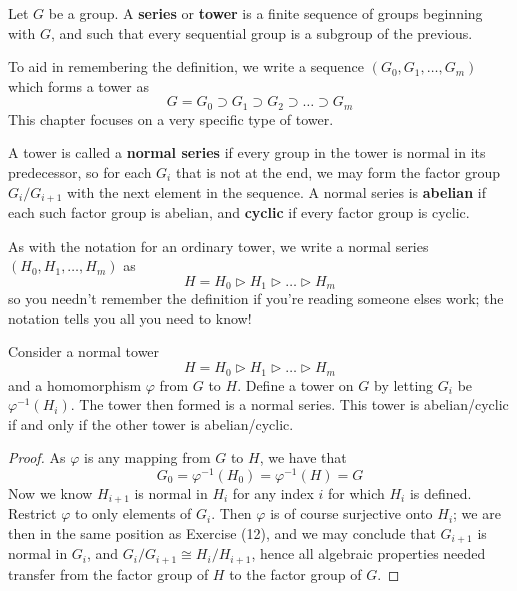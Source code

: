 \begin{definition}
    Let $G$ be a group. A {\bf series}  or {\bf tower}  is a finite sequence of groups beginning with $G$, and such that every sequential group is a subgroup of the previous.
\end{definition}

To aid in remembering the definition, we write a sequence $(G_0, G_1, \dots, G_m)$ which forms a tower as
%
\[ G = G_0 \supset G_1 \supset G_2 \supset \dots \supset G_m \]
%
This chapter focuses on a very specific type of tower.

\begin{definition}
    A tower is called a {\bf normal series} if every group in the tower is normal in its predecessor, so for each $G_i$ that is not at the end, we may form the factor group $G_i/G_{i+1}$ with the next element in the sequence. A normal series is {\bf abelian} if each such factor group is abelian, and {\bf cyclic}  if every factor group is cyclic.
\end{definition}

As with the notation for an ordinary tower, we write a normal series $(H_0, H_1, \dots, H_m)$ as
%
\[ H = H_0 \rhd H_1 \rhd \dots \rhd H_m \]
%
so you needn't remember the definition if you're reading someone elses work; the notation tells you all you need to know!

\begin{theorem}
    Consider a normal tower
    \[ H = H_0 \rhd H_1 \rhd \dots \rhd H_m \]
    and a homomorphism $\varphi$ from $G$ to $H$. Define a tower on $G$ by letting $G_i$ be $\varphi^{-1}(H_i)$. The tower then formed is a normal series. This tower is abelian/cyclic if and only if the other tower is abelian/cyclic.
\end{theorem}
\begin{proof}
    As $\varphi$ is any mapping from $G$ to $H$, we have that
    \[ G_0 = \varphi^{-1}(H_0) = \varphi^{-1}(H) = G \]
    Now we know $H_{i+1}$ is normal in $H_i$ for any index $i$ for which $H_i$ is defined. Restrict $\varphi$ to only elements of $G_i$. Then $\varphi$ is of course surjective onto $H_i$; we are then in the same position as Exercise (12), and we may conclude that $G_{i+1}$ is normal in $G_i$, and $G_i/G_{i+1} \cong H_i/H_{i+1}$, hence all algebraic properties needed transfer from the factor group of $H$ to the factor group of $G$.
\end{proof}


